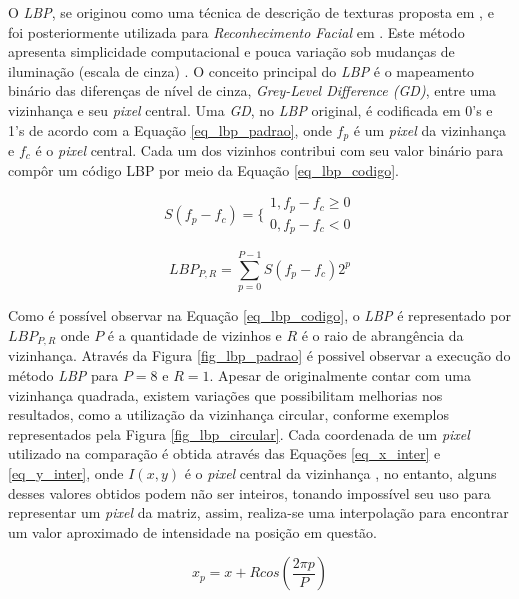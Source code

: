\documentclass[conference]{IEEEtran}
\begin{document}
O \textit{LBP}, se originou como uma técnica de descrição de texturas proposta em \cite{ojala}, e foi posteriormente utilizada para \textit{Reconhecimento Facial} em \cite{ahonen2}. Este método apresenta simplicidade computacional e pouca variação sob mudanças de iluminação (escala de cinza) \cite{livro4}. O conceito principal do \textit{LBP} é o mapeamento binário das diferenças de nível de cinza, \textit{Grey-Level Difference (GD)}, entre uma vizinhança e seu \textit{pixel} central. Uma \textit{GD}, no \textit{LBP} original, é codificada em 0's e 1's de acordo com a Equação \ref{eq_lbp_padrao}, onde $f_p$ é um \textit{pixel} da vizinhança e $f_c$ é o \textit{pixel} central. Cada um dos vizinhos contribui com seu valor binário para compôr um código LBP por meio da Equação \ref{eq_lbp_codigo}.

\begin{equation}
S(f_p - f_c) = \lbrace\begin{array}{c}
 1, f_p - f_c \geq 0
  \\
  0, f_p - f_c < 0
\end{array}
\label{eq_lbp_padrao}
\end{equation}

\begin{equation}
LBP_{P,R} = \sum_{p=0}^{P-1} S(f_p - f_c)2^{p}
\label{eq_lbp_codigo}
\end{equation} 

Como é possível observar na Equação \ref{eq_lbp_codigo}, o \textit{LBP} é representado por $LBP_{P,R}$ onde $P$ é a quantidade de vizinhos e $R$ é o raio de abrangência da vizinhança. Através da Figura \ref{fig_lbp_padrao} é possivel observar a execução do método \textit{LBP} para $P = 8$ e $R=1$. Apesar de originalmente contar com uma vizinhança quadrada, existem variações que possibilitam melhorias nos resultados, como a utilização da vizinhança circular, conforme exemplos representados pela Figura \ref{fig_lbp_circular}. Cada coordenada de um \textit{pixel} utilizado na comparação é obtida através das Equações \ref{eq_x_inter} e \ref{eq_y_inter}, onde $I(x,y)$ é o \textit{pixel} central da vizinhança \cite{livro2}, no entanto, alguns desses valores obtidos podem não ser inteiros, tonando impossível seu uso para representar um \textit{pixel} da matriz, assim, realiza-se uma interpolação para encontrar um valor aproximado de intensidade na posição em questão.



\begin{equation}
x_p = x+Rcos(\frac{2 \pi p}{P})
\label{eq_x_inter}
\end{equation} 
\end{document}

